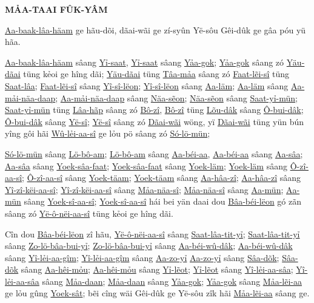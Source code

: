 \documentclass[twoside,twocolumn,a4paper,10pt]{memoir}
\begin{document}
	\vskip 36pt
	\begin{center} \large \textbf{MẢA-TAAI FÛK-YÂM} \normalsize \end{center}
\begin{scripture}
	\noindent
	\underline{Aa-baak-lâa-häam} ge hãu-dõi, dãai-wãi ge zí-syûn Yë-sôu Gêi-dûk ge gâa póu yü hãa.
	
	\underline{Aa-baak-lâa-häam} sâang \underline{Yỉ-saat}, \underline{Yỉ-saat} sâang \underline{Yảa-gok}; \underline{Yảa-gok} sâang zó \underline{Yäu-dãai} tüng kẻoi ge hîng dãi; \underline{Yäu-dãai} tüng \underline{Tâa-mảa} sâang zó \underline{Faat-lẽi-sî} tüng \underline{Saat-lâa}; \underline{Faat-lẽi-sî} sâang \underline{Yî-sî-lëon}; \underline{Yî-sî-lëon} sâang \underline{Aa-läm};
	\underline{Aa-läm} sâang \underline{Aa-mải-näa-daap}; \underline{Aa-mải-näa-daap} sâang \underline{Näa-sẽon}; \underline{Näa-sẽon} sâang \underline{Saat-yỉ-mün};
	\underline{Saat-yỉ-mün} tüng \underline{Lâa-hãp} sâang zó \underline{Bô-zî}, \underline{Bô-zî} tüng \underline{Lõu-dâk} sâang \underline{Ô-bui-dâk}; \underline{Ô-bui-dâk} sâang \underline{Yë-sî};
	\underline{Yë-sî} sâang zó \underline{Dãai-wãi} wöng, yï \underline{Dãai-wãi} tüng yün bún yîng gôi hãi \underline{Wû-lẻi-aa-sî} ge lỏu pö sâang zó \underline{Só-lö-mün};
	
	\underline{Só-lö-mün} sâang \underline{Lö-bô-am}; \underline{Lö-bô-am} sâang \underline{Aa-béi-aa}, \underline{Aa-béi-aa} sâang \underline{Aa-sâa};
	\underline{Aa-sâa} sâang \underline{Yoek-sâa-faat}; \underline{Yoek-sâa-faat} sâang \underline{Yoek-läm}; \underline{Yoek-läm} sâang \underline{Ô-zî-aa-sî};
	\underline{Ô-zî-aa-sî} sâang \underline{Yoek-täam}; \underline{Yoek-täam} sâang \underline{Aa-hâa-zî}; \underline{Aa-hâa-zî} sâang \underline{Yî-zî-këi-aa-sî};
	\underline{Yî-zî-këi-aa-sî} sâang \underline{Mảa-näa-sî}; \underline{Mảa-näa-sî} sâang \underline{Aa-mün}; \underline{Aa-mün} sâang \underline{Yoek-sî-aa-sî};
	\underline{Yoek-sî-aa-sî} hái bei yän daai dou \underline{Bâa-béi-lëon} gó zãn sâang zó \underline{Yë-ô-nëi-aa-sî} tüng kẻoi ge hîng dãi.
	
	Cîn dou \underline{Bâa-béi-lëon} zî hãu, \underline{Yë-ô-nëi-aa-sî} sâang \underline{Saat-lâa-tit-yỉ}; \underline{Saat-lâa-tit-yỉ} sâang \underline{Zo-lö-bâa-bui-yỉ};
	\underline{Zo-lö-bâa-bui-yỉ} sâang \underline{Aa-béi-wû-dâk}; \underline{Aa-béi-wû-dâk} sâang \underline{Yî-lẻi-aa-gîm}; \underline{Yî-lẻi-aa-gîm} sâang \underline{Aa-zo-yỉ}
	\underline{Aa-zo-yỉ} sâang \underline{Sâa-dõk}; \underline{Sâa-dõk} sâang \underline{Aa-hêi-mỏu}; \underline{Aa-hêi-mỏu} sâang \underline{Yỉ-lẽot};
	\underline{Yỉ-lẽot} sâang \underline{Yî-lẻi-aa-sâa}; \underline{Yî-lẻi-aa-sâa} sâang \underline{Mảa-daan}; \underline{Mảa-daan} sâang \underline{Yảa-gok};
	\underline{Yảa-gok} sâang \underline{Mảa-lẽi-aa} ge lỏu gûng \underline{Yoek-sât}; bẽi cîng wäi Gêi-dûk ge Yë-sôu zîk hãi \underline{Mảa-lẽi-aa} sâang ge.
	

\end{scripture}
\end{document}
